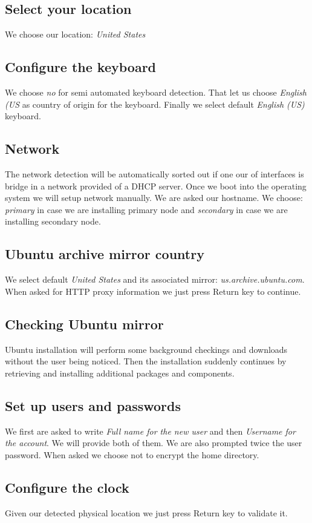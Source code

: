 \subsection {Select your location}
We choose our location: \textit{United States}
\subsection {Configure the keyboard}
We choose \textit{no} for semi automated keyboard detection. That let us choose \textit{English (US} as country of origin for the keyboard. Finally we select default \textit{English (US)} keyboard.
\subsection {Network}
The network detection will be automatically sorted out if one our of interfaces is bridge in a network provided of a DHCP server. Once we boot into the operating system we will setup network manually. We are asked our hostname. We choose: \textit{primary} in case we are installing primary node and \textit{secondary} in case we are installing secondary node.
\subsection {Ubuntu archive mirror country}
We select default \textit{United States} and its associated mirror: \textit{us.archive.ubuntu.com}. When asked for HTTP proxy information we just press Return key to continue.
\subsection {Checking Ubuntu mirror}
Ubuntu installation will perform some background checkings and downloads without the user being noticed. Then the installation suddenly continues by retrieving and installing additional packages and components.
\subsection {Set up users and passwords}
We first are asked to write \textit{Full name for the new user} and then \textit{Username for the account}. We will provide both of them. We are also prompted twice the user password. When asked we choose not to encrypt the home directory.
\subsection {Configure the clock}
Given our detected physical location we just press Return key to validate it.
